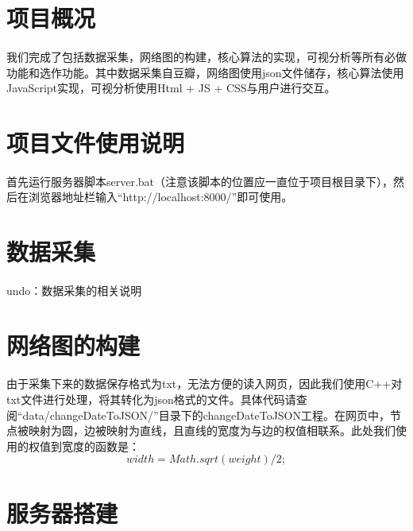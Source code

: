 \documentclass{article}
\begin{document}
\begin{CJK}{UTF8}{gkai}
\section{项目概况} %
	\paragraph{}
	我们完成了包括数据采集，网络图的构建，核心算法的实现，可视分析等所有必做功能和选作功能。其中数据采集自豆瓣，网络图使用json文件储存，核心算法使用JavaScript实现，可视分析使用Html + JS + CSS与用户进行交互。

\section{项目文件使用说明} %
	\paragraph{}
	首先运行服务器脚本server.bat（注意该脚本的位置应一直位于项目根目录下），然后在浏览器地址栏输入“http://localhost:8000/”即可使用。

\section{数据采集} %
	\paragraph{}
	undo：数据采集的相关说明

\section{网络图的构建} %
	\paragraph{}
	由于采集下来的数据保存格式为txt，无法方便的读入网页，因此我们使用C++对txt文件进行处理，将其转化为json格式的文件。具体代码请查阅“data/changeDateToJSON/”目录下的changeDateToJSON工程。在网页中，节点被映射为圆，边被映射为直线，且直线的宽度为与边的权值相联系。此处我们使用的权值到宽度的函数是：
		$$width = Math.sqrt(weight)/2;$$

\section{服务器搭建} %

\end{CJK}
\end{document}
